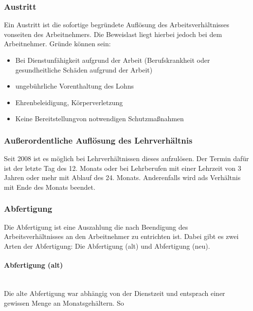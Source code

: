 \documentclass{article}
\newcommand{\paragraphlb}[1]{\paragraph{#1}\mbox{}\\}
\begin{document}
	\subsubsection{Austritt}
	Ein Austritt ist die sofortige begründete Auflösung des Arbeitsverhältnisses vonseiten des Arbeitnehmers. Die Beweislast liegt hierbei jedoch bei dem Arbeitnehmer. Gründe können sein:
	\begin{itemize}
		\item{Bei Dienstunfähigkeit aufgrund der Arbeit (Berufskrankheit oder gesundheitliche Schäden aufgrund der Arbeit)}
		\item{ungebührliche Vorenthaltung des Lohns}
		\item{Ehrenbeleidigung, Körperverletzung}
		\item{Keine Bereitstellungvon notwendigen Schutzmaßnahmen}
	\end{itemize}
	\subsubsection{Außerordentliche Auflösung des Lehrverhältnis}
	Seit 2008 ist es möglich bei Lehrverhältnissen dieses aufzulösen. Der Termin dafür ist der letzte Tag des 12. Monats oder bei Lehrberufen mit einer Lehrzeit von 3 Jahren oder mehr mit Ablauf des 24. Monats. Anderenfalls wird ads Verhältnis mit Ende des Monats beendet.
	\subsubsection{Abfertigung}
	Die Abfertigung ist eine Auszahlung die nach Beendigung des Arbeitsverhältnisses an den Arbeitnehmer zu entrichten ist. Dabei gibt es zwei Arten der Abfertigung: Die Abfertigung (alt) und Abfertigung (neu).
	\paragraphlb{Abfertigung (alt)} 
	Die alte Abfertigung war abhängig von der Dienstzeit und entsprach einer gewissen Menge an Monatsgehältern.  So
\end{document}
